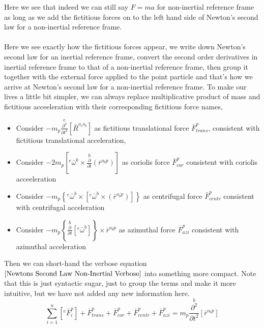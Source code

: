 Here we see that indeed we can still say $F = ma$ for non-inertial reference frame as long as we add the fictitious forces on to the left hand side of Newton's second law for a non-inertial reference frame.
\\~\\Here we see exactly how the fictitious forces appear, we write down Newton's second law for an inertial reference frame, convert the second order derivatives in inertial reference frame to that of a non-inertial reference frame, then group it together with the external force applied to the point particle and that's how we arrive at Newton's second law for a non-inertial reference frame.
To make our lives a little bit simpler, we can always replace multiplicative product of mass and fictitious acceeleration with their corresponding fictitious force names,
\begin{itemize}
\item Consider $\displaystyle  - m_{p}\overset{e}{\frac{\partial^{2}}{\partial t^{2}}}[\bar{R}^{o_{e}o_{b}}]$ as fictitious translational force $\bar{F}^{p}_{trans}$, consistent with fictitious translational acceleration,
\item Consider $\displaystyle  - 2m_{p}\left[{}^{e}\bar{\omega}^{b}\times\overset{b}{\frac{\partial}{\partial t}}(\bar{r}^{o_{b}p})\right]$ as coriolis force $\bar{F}^{p}_{cor}$ consistent with coriolis acceeleration
\item Consider $\displaystyle  - m_{p}\left\{{}^{e}\bar{\omega}^{b}\times\left[{}^{e}\bar{\omega}^{b}\times\left(\bar{r}^{o_{b}p}\right)\right]\right\}$ as centrifugal force $\bar{F}^{p}_{centr}$ consistent with centrifugal acceleration
\item Consider $\displaystyle  - m_{p}\left\{\overset{b}{\frac{\partial}{\partial t}}[{}^{e}\bar{\omega}^{b}]\right\}\times\bar{r}^{o_{b}p}$ as azimuthal force $\bar{F}^{p}_{azi}$ consistent with azimuthal acceleration
\end{itemize}
Then we can short-hand the verbose equation $\ref{Newtons Second Law Non-Inertial Verbose}$ into something more compact.
Note that this is just syntactic sugar, just to group the terms and make it more intuitive, but we have not added any new information here.
\begin{equation}
\sum^{n}_{i = 1}\left[{}^{e}\bar{F}^{p}_{i}\right] + \bar{F}^{p}_{trans} + \bar{F}^{p}_{cor} + \bar{F}^{p}_{centr} + \bar{F}^{p}_{azi} 
= m_{p}\overset{b}{\frac{\partial^{2}}{\partial t^{2}}}[\bar{r}^{o_{b}p}] 
\label{Newtons Second Law Non-Inertial Simple}
\end{equation}


